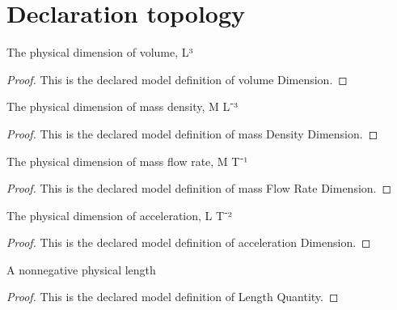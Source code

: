 \section{Declaration topology}
\begin{definition}
  \label{def:physics:phyx-mini-0238:phyxminiproblems-problemphyxmini0238-volumedimension}
  The physical dimension of volume, L³
\end{definition}
\begin{proof}
  This is the declared model definition of volume Dimension.
\end{proof}
\begin{definition}
  \label{def:physics:phyx-mini-0238:phyxminiproblems-problemphyxmini0238-massdensitydimension}
  The physical dimension of mass density, M L⁻³
\end{definition}
\begin{proof}
  This is the declared model definition of mass Density Dimension.
\end{proof}
\begin{definition}
  \label{def:physics:phyx-mini-0238:phyxminiproblems-problemphyxmini0238-massflowratedimension}
  The physical dimension of mass flow rate, M T⁻¹
\end{definition}
\begin{proof}
  This is the declared model definition of mass Flow Rate Dimension.
\end{proof}
\begin{definition}
  \label{def:physics:phyx-mini-0238:phyxminiproblems-problemphyxmini0238-accelerationdimension}
  The physical dimension of acceleration, L T⁻²
\end{definition}
\begin{proof}
  This is the declared model definition of acceleration Dimension.
\end{proof}
\begin{definition}
  \label{def:physics:phyx-mini-0238:phyxminiproblems-problemphyxmini0238-lengthquantity}
  A nonnegative physical length
\end{definition}
\begin{proof}
  This is the declared model definition of Length Quantity.
\end{proof}
